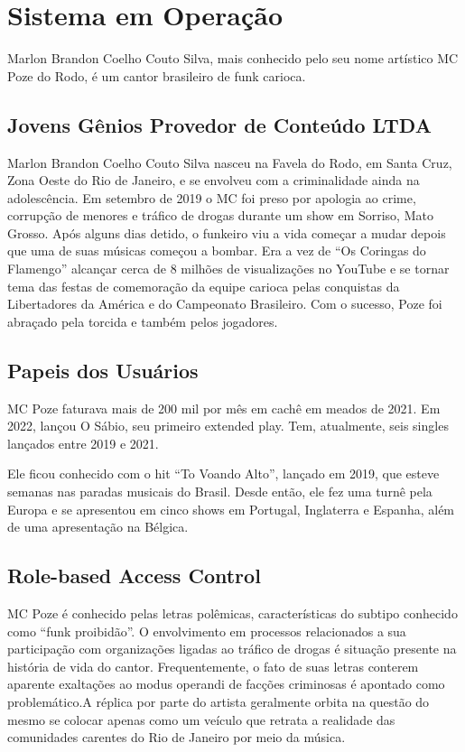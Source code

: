 \chapter{Sistema em Operação}
\label{chap5}

Marlon Brandon Coelho Couto Silva, mais conhecido pelo seu nome artístico MC Poze do Rodo, é um cantor brasileiro de funk carioca.

\section{Jovens Gênios Provedor de Conteúdo LTDA}

Marlon Brandon Coelho Couto Silva nasceu na Favela do Rodo, em Santa Cruz, Zona Oeste do Rio de Janeiro, e se envolveu com a criminalidade ainda na adolescência. Em setembro de 2019 o MC foi preso por apologia ao crime, corrupção de menores e tráfico de drogas durante um show em Sorriso, Mato Grosso. Após alguns dias detido, o funkeiro viu a vida começar a mudar depois que uma de suas músicas começou a bombar. Era a vez de ``Os Coringas do Flamengo'' alcançar cerca de 8 milhões de visualizações no YouTube e se tornar tema das festas de comemoração da equipe carioca pelas conquistas da Libertadores da América e do Campeonato Brasileiro. Com o sucesso, Poze foi abraçado pela torcida e também pelos jogadores. \cite{alvim2007}

\section{Papeis dos Usuários}

MC Poze faturava mais de 200 mil por mês em cachê em meados de 2021. Em 2022, lançou O Sábio, seu primeiro extended play. Tem, atualmente, seis singles lançados entre 2019 e 2021.

Ele ficou conhecido com o hit ``To Voando Alto'', lançado em 2019, que esteve semanas nas paradas musicais do Brasil. Desde então, ele fez uma turnê pela Europa e se apresentou em cinco shows em Portugal, Inglaterra e Espanha, além de uma apresentação na Bélgica.

\section{Role-based Access Control}

MC Poze é conhecido pelas letras polêmicas, características do subtipo conhecido como ``funk proibidão''. O envolvimento em processos relacionados a sua participação com organizações ligadas ao tráfico de drogas é situação presente na história de vida do cantor. Frequentemente, o fato de suas letras conterem aparente exaltações ao modus operandi de facções criminosas é apontado como problemático.A réplica por parte do artista geralmente orbita na questão do mesmo se colocar apenas como um veículo que retrata a realidade das comunidades carentes do Rio de Janeiro por meio da música.
